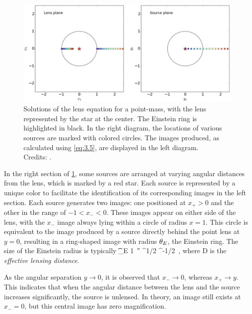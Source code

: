 \begin{figure}
    \centering
    \includegraphics[width=\linewidth, keepaspectratio]{img//chapter3/pointmass_solutions.png}
    \caption[Lens equation solutions for point-mass lens]{Solutions of the lens equation for a point-mass, with the lens represented by the star at the center. The Einstein ring is highlighted in black. In the right diagram, the locations of various sources are marked with colored circles. The images produced, as calculated using \cref{eq:3.5}, are displayed in the left diagram.\\\small{Credits: \cite{meneghetti_introduction_2021}.}}
    \label{fig:pointmass_solutions}
\end{figure}

In the right section of \cref{fig:pointmass_solutions}, some sources are arranged at varying angular distances from the lens, which is marked by a red star. Each source is represented by a unique color to facilitate the identification of its corresponding images in the left section. Each source generates two images: one positioned at $x_+ > 0$ and the other in the range of $-1 < x_- < 0$. These images appear on either side of the lens, with the $x_-$ image always lying within a circle of radius $x = 1$. This circle is equivalent to the image produced by a source directly behind the point lens at $y = 0$, resulting in a ring-shaped image with radius $\theta_E$, the Einstein ring.
The size of the Einstein radius is typically
\be
\label{eq:3.6}
\t_E \approx \SI{1}{\arcsecond} ^{1/2} ^{-1/2} \,,
\ee
where
\be
\label{eq:3.7}
D \equiv {}
\ee
is the \emph{effective lensing distance}.

As the angular separation $y \rightarrow 0$, it is observed that $x_- \rightarrow 0$, whereas $x_+ \rightarrow y$. This indicates that when the angular distance between the lens and the source increases significantly, the source is unlensed. In theory, an image still exists at $x_- = 0$, but this central image has zero magnification.


